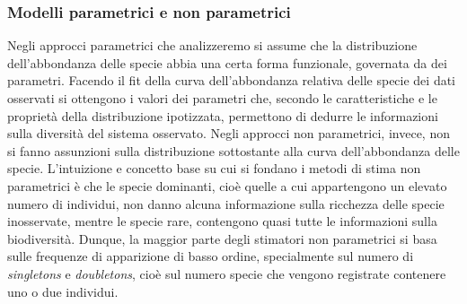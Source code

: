 \subsubsection{Modelli parametrici e non parametrici}
Negli approcci parametrici che analizzeremo si assume che la distribuzione dell'abbondanza delle specie abbia una certa forma funzionale, governata da dei parametri. Facendo il fit della curva dell'abbondanza relativa delle specie dei dati osservati si ottengono i valori dei parametri che, secondo le caratteristiche e le proprietà della distribuzione ipotizzata, permettono di dedurre le informazioni sulla diversità del sistema osservato.\newline
Negli approcci non parametrici, invece, non si fanno assunzioni sulla distribuzione sottostante alla curva dell'abbondanza delle specie. L'intuizione e concetto base su cui si fondano i metodi di stima non parametrici è che le specie dominanti, cioè quelle a cui appartengono un elevato numero di individui, non danno alcuna informazione sulla ricchezza delle specie inosservate, mentre le specie rare, contengono quasi tutte le informazioni sulla biodiversità. Dunque, la maggior parte degli stimatori non parametrici si basa sulle frequenze di apparizione di basso ordine, specialmente sul numero di \emph{singletons} e \emph{doubletons}, cioè sul numero specie che vengono registrate contenere uno o due individui.

